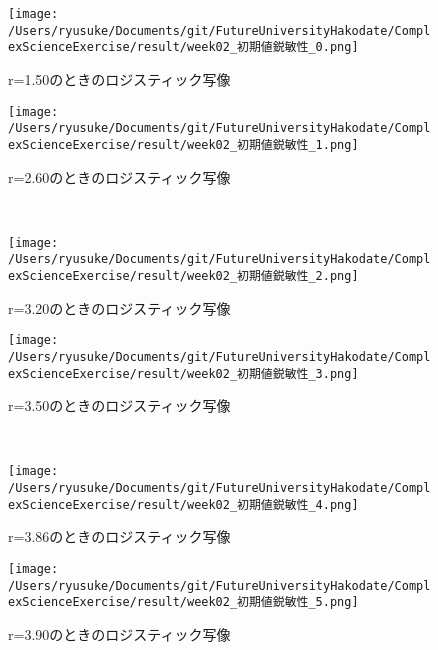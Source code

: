 \documentclass[a4j]{jsarticle}
\begin{document}
\begin{figure}[htbp]
 \begin{minipage}{0.5\hsize}
  \begin{center}
   \texttt{[image: /Users/ryusuke/Documents/git/FutureUniversityHakodate/ComplexScienceExercise/result/week02\_初期値鋭敏性\_0.png]}
  \end{center}
  \caption{r=1.50のときのロジスティック写像}
  \label{fig:logistic_1}
 \end{minipage}
 \begin{minipage}{0.5\hsize}
  \begin{center}
   \texttt{[image: /Users/ryusuke/Documents/git/FutureUniversityHakodate/ComplexScienceExercise/result/week02\_初期値鋭敏性\_1.png]}
  \end{center}
  \caption{r=2.60のときのロジスティック写像}
  \label{fig:logistic_2}
 \end{minipage} \\
 \begin{minipage}{0.5\hsize}
  \begin{center}
   \texttt{[image: /Users/ryusuke/Documents/git/FutureUniversityHakodate/ComplexScienceExercise/result/week02\_初期値鋭敏性\_2.png]}
  \end{center}
  \caption{r=3.20のときのロジスティック写像}
  \label{fig:logistic_3}
 \end{minipage}
 \begin{minipage}{0.5\hsize}
  \begin{center}
   \texttt{[image: /Users/ryusuke/Documents/git/FutureUniversityHakodate/ComplexScienceExercise/result/week02\_初期値鋭敏性\_3.png]}
  \end{center}
  \caption{r=3.50のときのロジスティック写像}
  \label{fig:logistic_4}
 \end{minipage} \\
 \begin{minipage}{0.5\hsize}
  \begin{center}
   \texttt{[image: /Users/ryusuke/Documents/git/FutureUniversityHakodate/ComplexScienceExercise/result/week02\_初期値鋭敏性\_4.png]}
  \end{center}
  \caption{r=3.86のときのロジスティック写像}
  \label{fig:logistic_5}
 \end{minipage}
 \begin{minipage}{0.5\hsize}
  \begin{center}
   \texttt{[image: /Users/ryusuke/Documents/git/FutureUniversityHakodate/ComplexScienceExercise/result/week02\_初期値鋭敏性\_5.png]}
  \end{center}
  \caption{r=3.90のときのロジスティック写像}
  \label{fig:logistic_6}
 \end{minipage}
\end{figure}
\end{document}
